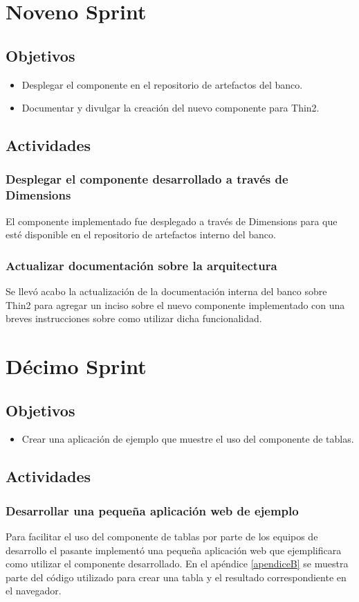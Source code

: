 \section{Noveno Sprint}

\subsection{Objetivos}
\begin{itemize}
  \item Desplegar el componente en el repositorio de artefactos del banco.
  \item Documentar y divulgar la creación del nuevo componente para Thin2.
\end{itemize}
\subsection{Actividades}
\subsubsection{Desplegar el componente desarrollado a través de Dimensions}
El componente implementado fue desplegado a través de Dimensions para que esté
disponible en el repositorio de artefactos interno del banco.
\subsubsection{Actualizar documentación sobre la arquitectura}
Se llevó acabo la actualización de la documentación interna del banco sobre
Thin2 para agregar un inciso sobre el nuevo componente implementado con
una breves instrucciones sobre como utilizar dicha funcionalidad.

\section{Décimo Sprint}

\subsection{Objetivos}
\begin{itemize}
  \item Crear una aplicación de ejemplo que muestre el uso del componente de tablas.
\end{itemize}
\subsection{Actividades}
\subsubsection{Desarrollar una pequeña aplicación web de ejemplo}
Para facilitar el uso del componente de tablas por parte de los equipos de
desarrollo el pasante implementó una pequeña aplicación web que ejemplificara
como utilizar el componente desarrollado. En el apéndice \ref{apendiceB} se muestra parte
del código utilizado para crear una tabla y el resultado correspondiente en el navegador.
